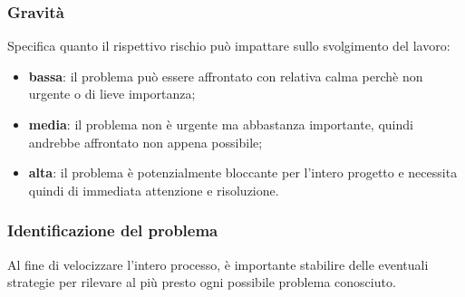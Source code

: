     \subsubsection{Gravità}
        Specifica quanto il rispettivo rischio può impattare sullo svolgimento del lavoro:
        \begin{itemize}
            \item \textbf{bassa}: il problema può essere affrontato con relativa calma perchè non urgente o di lieve importanza;
            \item \textbf{media}: il problema non è urgente ma abbastanza importante, quindi andrebbe affrontato non appena possibile;
            \item \textbf{alta}: il problema è potenzialmente bloccante per l'intero progetto e necessita quindi di immediata attenzione e risoluzione.
        \end{itemize}
    
    \subsubsection{Identificazione del problema}
        Al fine di velocizzare l'intero processo, è importante stabilire delle eventuali strategie per rilevare al più presto ogni possibile problema conosciuto.

